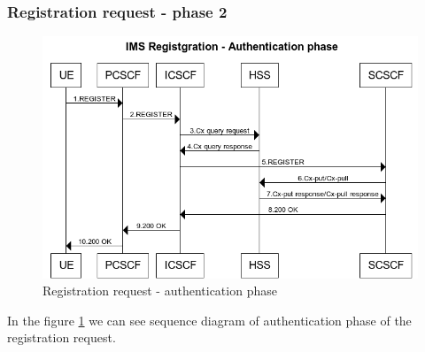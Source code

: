 \documentclass[hidelinks]{report}
\begin{document}
\subsubsection{Registration request - phase 2}
\begin{figure}[!htbp]
\begin{center}
\includegraphics[scale=0.5]{IMS_Registration_2.png} 
\caption{Registration request - authentication phase}
\label{fig3}
\end{center}
\end{figure}
In the figure \ref{fig3} we can see sequence diagram of authentication phase of the registration request. 
\end{document}
